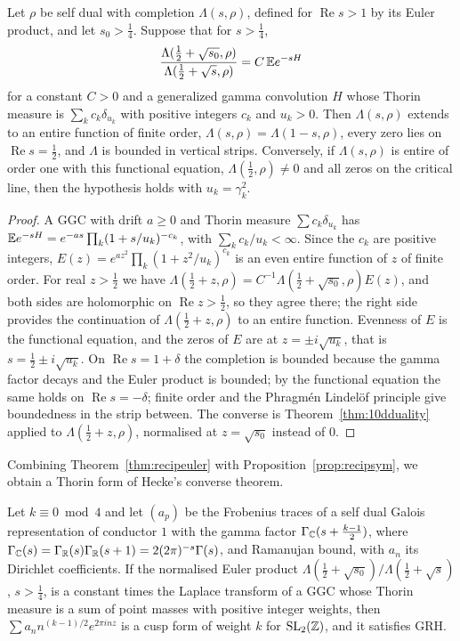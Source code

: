 \begin{theorem}\label{thm:recipeuler}
Let $\rho$ be self dual with completion $\Lambda(s,\rho)$, defined for $\operatorname{Re}s>1$ by its Euler product, and let $s_0>\frac14$. Suppose that for $s>\frac14$,
\[
\frac{\Lambda(\frac12+\sqrt{s_0},\rho)}{\Lambda(\frac12+\sqrt s,\rho)}=C\,\mathbb{E} e^{-sH}
\]
for a constant $C>0$ and a generalized gamma convolution $H$ whose Thorin measure is $\sum_kc_k\delta_{u_k}$ with positive integers $c_k$ and $u_k>0$. Then $\Lambda(s,\rho)$ extends to an entire function of finite order, $\Lambda(s,\rho)=\Lambda(1-s,\rho)$, every zero lies on $\operatorname{Re}s=\frac12$, and $\Lambda$ is bounded in vertical strips. Conversely, if $\Lambda(s,\rho)$ is entire of order one with this functional equation, $\Lambda(\frac12,\rho)\ne0$ and all zeros on the critical line, then the hypothesis holds with $u_k=\gamma_k^2$.
\end{theorem}

\begin{proof}
A GGC with drift $a\ge0$ and Thorin measure $\sum c_k\delta_{u_k}$ has $\mathbb{E} e^{-sH}=e^{-as}\prod_k(1+s/u_k)^{-c_k}$, with $\sum_kc_k/u_k<\infty$. Since the $c_k$ are positive integers, $E(z)=e^{az^2}\prod_k(1+z^2/u_k)^{c_k}$ is an even entire function of $z$ of finite order. For real $z>\frac12$ we have $\Lambda(\frac12+z,\rho)=C^{-1}\Lambda(\frac12+\sqrt{s_0},\rho)E(z)$, and both sides are holomorphic on $\operatorname{Re}z>\frac12$, so they agree there; the right side provides the continuation of $\Lambda(\frac12+z,\rho)$ to an entire function. Evenness of $E$ is the functional equation, and the zeros of $E$ are at $z=\pm i\sqrt{u_k}$, that is $s=\frac12\pm i\sqrt{u_k}$. On $\operatorname{Re}s=1+\delta$ the completion is bounded because the gamma factor decays and the Euler product is bounded; by the functional equation the same holds on $\operatorname{Re}s=-\delta$; finite order and the Phragm\'en Lindel\"of principle give boundedness in the strip between. The converse is Theorem~\ref{thm:10dduality} applied to $\Lambda(\frac12+z,\rho)$, normalised at $z=\sqrt{s_0}$ instead of $0$.
\end{proof}

Combining Theorem~\ref{thm:recipeuler} with Proposition~\ref{prop:recipsym}, we obtain a Thorin form of Hecke's converse theorem.

\begin{corollary}\label{cor:recipconverse}
Let $k\equiv0\bmod4$ and let $(a_p)$ be the Frobenius traces of a self dual Galois representation of conductor $1$ with the gamma factor $\Gamma_{\mathbb{C}}(s+\frac{k-1}2)$, where $\Gamma_{\mathbb{C}}(s)=\Gamma_{\mathbb{R}}(s)\Gamma_{\mathbb{R}}(s+1)=2(2\pi)^{-s}\Gamma(s)$, and Ramanujan bound, with $a_n$ its Dirichlet coefficients. If the normalised Euler product $\Lambda(\frac12+\sqrt{s_0})/\Lambda(\frac12+\sqrt s)$, $s>\frac14$, is a constant times the Laplace transform of a GGC whose Thorin measure is a sum of point masses with positive integer weights, then $\sum a_nn^{(k-1)/2}e^{2\pi inz}$ is a cusp form of weight $k$ for $\mathrm{SL}_2(\mathbb{Z})$, and it satisfies GRH.
\end{corollary}

